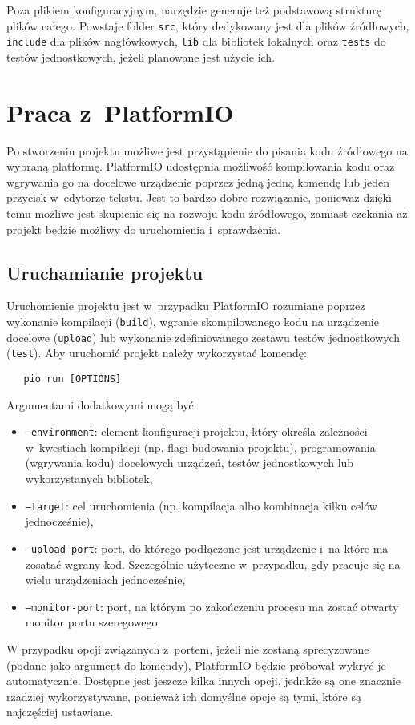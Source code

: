 Poza plikiem konfiguracyjnym, narzędzie generuje też podstawową strukturę plików całego. Powstaje folder \texttt{src},
który dedykowany jest dla plików źródłowych, \texttt{include} dla plików nagłówkowych, \texttt{lib} dla bibliotek
lokalnych oraz \texttt{tests} do testów jednostkowych, jeżeli planowane jest użycie ich.

\section{Praca z~PlatformIO\label{sect:pio-work}} Po stworzeniu projektu możliwe jest przystąpienie do pisania kodu
źródłowego na wybraną platformę. PlatformIO udostępnia możliwość kompilowania kodu oraz wgrywania go na docelowe
urządzenie poprzez jedną jedną komendę lub jeden przycisk w~edytorze tekstu. Jest to bardzo dobre rozwiązanie,
ponieważ dzięki temu możliwe jest skupienie się na rozwoju kodu źródłowego, zamiast czekania aż projekt będzie możliwy
do uruchomienia i~sprawdzenia.

\subsection{Uruchamianie projektu\label{sect:pio-run}} Uruchomienie projektu jest w~przypadku PlatformIO rozumiane
poprzez wykonanie kompilacji (\texttt{build}), wgranie skompilowanego kodu na urządzenie docelowe (\texttt{upload}) lub
wykonanie zdefiniowanego zestawu testów jednostkowych (\texttt{test}). Aby uruchomić projekt należy wykorzystać komendę:
\begin{verbatim}
   pio run [OPTIONS]
\end{verbatim}
Argumentami dodatkowymi mogą być:
\begin{itemize}[label=]
    \item \texttt{--environment}: element konfiguracji projektu, który określa zależności w~kwestiach
          kompilacji (np. flagi budowania projektu), programowania (wgrywania kodu) docelowych urządzeń, testów
          jednostkowych lub wykorzystanych bibliotek,
    \item \texttt{--target}: cel uruchomienia (np. kompilacja albo kombinacja kilku celów jednocześnie),
    \item \texttt{--upload-port}: port, do którego podłączone jest urządzenie i~na które ma zosatać wgrany kod.
          Szczególnie użyteczne w~przypadku, gdy pracuje się na wielu urządzeniach jednocześnie,
    \item \texttt{--monitor-port}: port, na którym po zakończeniu procesu ma zostać otwarty monitor portu szeregowego.
\end{itemize}
W przypadku opcji związanych z~portem, jeżeli nie zostaną sprecyzowane (podane jako argument do komendy), PlatformIO
będzie próbował wykryć je automatycznie. Dostępne jest jeszcze kilka innych opcji, jednkże są one znacznie rzadziej
wykorzystywane, ponieważ ich domyślne opcje są tymi, które są najczęściej ustawiane.

